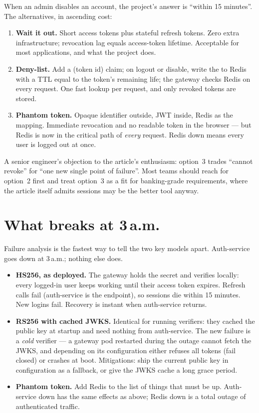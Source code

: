 \begin{decision}
When an admin disables an account, the project's answer is ``within 15
minutes''. The alternatives, in ascending cost:
\begin{enumerate}
  \item \textbf{Wait it out.} Short access tokens plus stateful refresh
  tokens. Zero extra infrastructure; revocation lag equals access-token
  lifetime. Acceptable for most applications, and what the project does.
  \item \textbf{Deny-list.} Add a  (token id) claim; on
  logout or disable, write the  to Redis with a TTL equal to
  the token's remaining life; the gateway checks Redis on every request.
  One fast lookup per request, and only revoked tokens are stored.
  \item \textbf{Phantom token.} Opaque identifier outside, JWT inside,
  Redis as the mapping. Immediate revocation and no readable token in
  the browser --- but Redis is now in the critical path of \emph{every}
  request. Redis down means every user is logged out at once.
\end{enumerate}
A senior engineer's objection to the article's enthusiasm: option~3
trades ``cannot revoke'' for ``one new single point of failure''. Most
teams should reach for option~2 first and treat option~3 as a fit for
banking-grade requirements, where the article itself admits sessions may
be the better tool anyway.
\end{decision}

\section{What breaks at 3\,a.m.}

Failure analysis is the fastest way to tell the two key models apart.
Auth-service goes down at 3\,a.m.; nothing else does.

\begin{itemize}
  \item \textbf{HS256, as deployed.} The gateway holds the secret and
  verifies locally: every logged-in user keeps working until their
  access token expires. Refresh calls fail (auth-service is the
   endpoint), so sessions die within 15 minutes. New
  logins fail. Recovery is instant when auth-service returns.
  \item \textbf{RS256 with cached JWKS.} Identical for running
  verifiers: they cached the public key at startup and need nothing from
  auth-service. The new failure is a \emph{cold} verifier --- a gateway
  pod restarted during the outage cannot fetch the JWKS, and depending on
  its configuration either refuses all tokens (fail closed) or crashes
  at boot. Mitigations: ship the current public key in configuration as
  a fallback, or give the JWKS cache a long grace period.
  \item \textbf{Phantom token.} Add Redis to the list of things that must
  be up. Auth-service down has the same effects as above; Redis down is
  a total outage of authenticated traffic.
\end{itemize}

